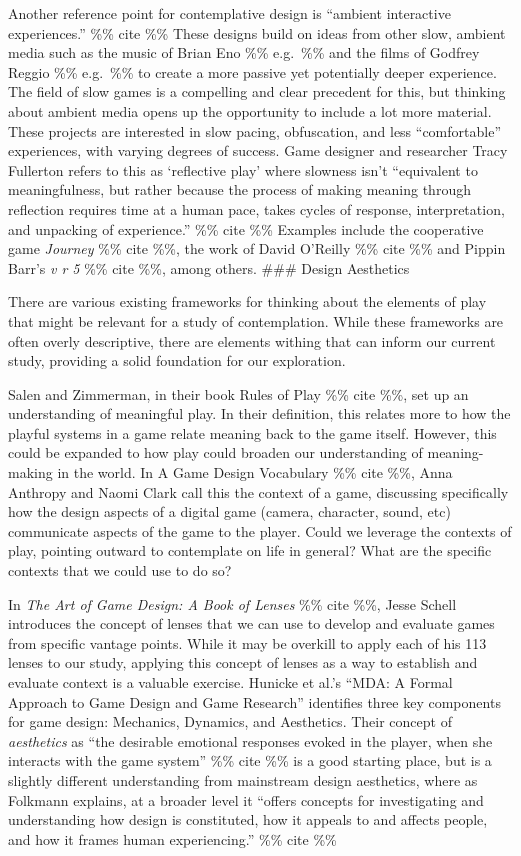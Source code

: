 \documentclass[
]{article}
\begin{document}
Another reference point for contemplative design is ``ambient
interactive experiences.'' \%\% cite \%\% These designs build on ideas
from other slow, ambient media such as the music of Brian Eno \%\%
e.g.~\%\% and the films of Godfrey Reggio \%\% e.g.~\%\% to create a
more passive yet potentially deeper experience. The field of slow games
is a compelling and clear precedent for this, but thinking about ambient
media opens up the opportunity to include a lot more material. These
projects are interested in slow pacing, obfuscation, and less
``comfortable'' experiences, with varying degrees of success. Game
designer and researcher Tracy Fullerton refers to this as `reflective
play' where slowness isn't ``equivalent to meaningfulness, but rather
because the process of making meaning through reflection requires time
at a human pace, takes cycles of response, interpretation, and unpacking
of experience.'' \%\% cite \%\% Examples include the cooperative game
\emph{Journey} \%\% cite \%\%, the work of David O'Reilly \%\% cite \%\%
and Pippin Barr's \emph{v r 5} \%\% cite \%\%, among others. \#\#\#
Design Aesthetics

There are various existing frameworks for thinking about the elements of
play that might be relevant for a study of contemplation. While these
frameworks are often overly descriptive, there are elements withing that
can inform our current study, providing a solid foundation for our
exploration.

Salen and Zimmerman, in their book Rules of Play \%\% cite \%\%, set up
an understanding of meaningful play. In their definition, this relates
more to how the playful systems in a game relate meaning back to the
game itself. However, this could be expanded to how play could broaden
our understanding of meaning-making in the world. In A Game Design
Vocabulary \%\% cite \%\%, Anna Anthropy and Naomi Clark call this the
context of a game, discussing specifically how the design aspects of a
digital game (camera, character, sound, etc) communicate aspects of the
game to the player. Could we leverage the contexts of play, pointing
outward to contemplate on life in general? What are the specific
contexts that we could use to do so?

In \emph{The Art of Game Design: A Book of Lenses} \%\% cite \%\%, Jesse
Schell introduces the concept of lenses that we can use to develop and
evaluate games from specific vantage points. While it may be overkill to
apply each of his 113 lenses to our study, applying this concept of
lenses as a way to establish and evaluate context is a valuable
exercise. Hunicke et al.'s ``MDA: A Formal Approach to Game Design and
Game Research'' identifies three key components for game design:
Mechanics, Dynamics, and Aesthetics. Their concept of \emph{aesthetics}
as ``the desirable emotional responses evoked in the player, when she
interacts with the game system'' \%\% cite \%\% is a good starting
place, but is a slightly different understanding from mainstream design
aesthetics, where as Folkmann explains, at a broader level it ``offers
concepts for investigating and understanding how design is constituted,
how it appeals to and affects people, and how it frames human
experiencing.'' \%\% cite \%\%
\end{document}
